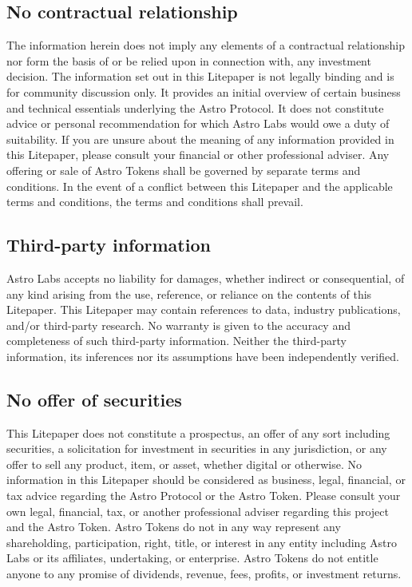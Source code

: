 \subsection{No contractual relationship}
The information herein does not imply any elements of a contractual relationship nor form the basis of or be relied upon in connection with, any investment decision. The information set out in this Litepaper is not legally binding and is for community discussion only. It provides an initial overview of certain business and technical essentials underlying the Astro Protocol. It does not constitute advice or personal recommendation for which Astro Labs would owe a duty of suitability. If you are unsure about the meaning of any information provided in this Litepaper, please consult your financial or other professional adviser. Any offering or sale of Astro Tokens shall be governed by separate terms and conditions. In the event of a conflict between this Litepaper and the applicable terms and conditions, the terms and conditions shall prevail.

\subsection{Third-party information}
Astro Labs accepts no liability for damages, whether indirect or consequential, of any kind arising from the use, reference, or reliance on the contents of this Litepaper. This Litepaper may contain references to data, industry publications, and/or third-party research. No warranty is given to the accuracy and completeness of such third-party information. Neither the third-party information, its inferences nor its assumptions have been independently verified.

\subsection{No offer of securities}
This Litepaper does not constitute a prospectus, an offer of any sort including securities, a solicitation for investment in securities in any jurisdiction, or any offer to sell any product, item, or asset, whether digital or otherwise. No information in this Litepaper should be considered as business, legal, financial, or tax advice regarding the Astro Protocol or the Astro Token. Please consult your own legal, financial, tax, or another professional adviser regarding this project and the Astro Token. Astro Tokens do not in any way represent any shareholding, participation, right, title, or interest in any entity including Astro Labs or its affiliates, undertaking, or enterprise. Astro Tokens do not entitle anyone to any promise of dividends, revenue, fees, profits, or investment returns.

